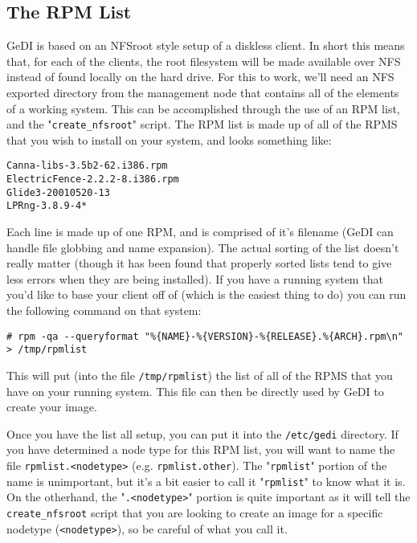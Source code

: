 \documentclass[10pt,a4paper,titlepage]{article}
\begin{document}
\subsection{The RPM List}
GeDI is based on an NFSroot style setup of a diskless client.  In short this
means that, for each of the clients, the root filesystem will be made
available over NFS instead of found locally on the hard drive.  For this to
work, we'll need an NFS exported directory from the management node that
contains all of the elements of a working system.  This can be accomplished
through the use of an RPM list, and the "\verb!create_nfsroot!" script.  The
RPM list is made up of all of the RPMS that you wish to install on your system,
and looks something like:

\begin{verbatim}
Canna-libs-3.5b2-62.i386.rpm
ElectricFence-2.2.2-8.i386.rpm
Glide3-20010520-13
LPRng-3.8.9-4*
\end{verbatim}

Each line is made up of one RPM, and is comprised of it's filename (GeDI can
handle file globbing and name expansion).  The actual sorting of the list
doesn't really matter (though it has been found that properly sorted lists tend
to give less errors when they are being installed).  If you have a running
system that you'd like to base your client off of (which is the easiest thing
to do) you can run the following command on that system:

\begin{verbatim}
# rpm -qa --queryformat "%{NAME}-%{VERSION}-%{RELEASE}.%{ARCH}.rpm\n" > /tmp/rpmlist
\end{verbatim}

This will put (into the file \verb!/tmp/rpmlist!) the list of all of the RPMS
that you have on your running system.  This file can then be directly used by
GeDI to create your image.

Once you have the list all setup, you can put it into the \verb!/etc/gedi!
directory.  If you have determined a node type for this RPM list, you will want
to name the file \verb!rpmlist.<nodetype>! (e.g. \verb!rpmlist.other!).  The
"\verb!rpmlist!" portion of the name is unimportant, but it's a bit easier
to call it "\verb!rpmlist!" to know what it is.  On the otherhand, the
"\verb!.<nodetype>!" portion is quite important as it will tell the
\verb!create_nfsroot! script that you are looking to create an image for a
specific nodetype (\verb!<nodetype>!), so be careful of what you call it.
\end{document}
